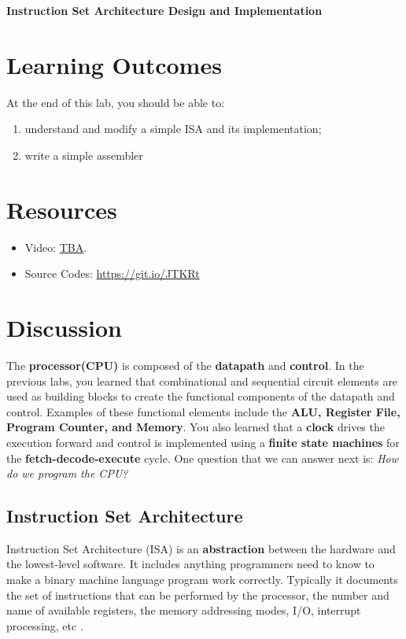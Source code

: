 \documentclass[a4paper, 11pt,oneside]{article}
\begin{document}
\begin{center}
	{\LARGE \textbf{Instruction Set Architecture Design and Implementation}}
\end{center}

\section*{Learning Outcomes}
   At the end of this lab, you should be able to:
   \begin{enumerate}[itemsep=0pt,parsep=0pt]
   	   \item understand and modify a simple ISA and its implementation;
       \item write a simple assembler
   \end{enumerate}   
\tableofcontents

\section{Resources}
\begin{itemize}
	\item Video: \href{TBA}{TBA}.
	\item Source Codes: \href{https://git.io/JTKRt}{https://git.io/JTKRt}
\end{itemize}	

\section{Discussion}
The \textbf{processor(CPU)} is composed of the \textbf{datapath} and 
\textbf{control}. In the previous labs, you learned that combinational and 
sequential circuit elements are used as building blocks to create the 
functional components of the datapath and control. Examples of these functional 
elements include the \textbf{ALU, Register File, Program Counter, and Memory}. 
You also learned that a \textbf{clock} drives the execution forward and control 
is implemented using a \textbf{finite state machines} for the 
\textbf{fetch-decode-execute} cycle. One question that we can answer next is: 
\textit{How do we program the CPU?}


\subsection{Instruction Set Architecture}
Instruction Set Architecture (ISA) is an \textbf{abstraction} between the 
hardware and the lowest-level software. It includes anything programmers need 
to know to make a binary machine language program work correctly. Typically it  
documents the set of instructions that can be performed by the 
processor, the number and name of available registers, the memory 
addressing modes, I/O, interrupt processing, etc \cite{CODARM}.
\end{document}
